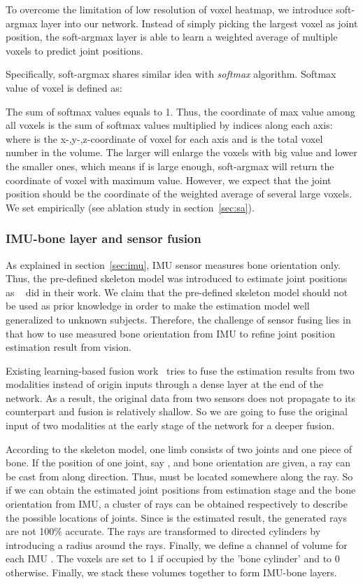 \documentclass[10pt,twocolumn,letterpaper]{article}
\begin{document}
To overcome the limitation of low resolution of voxel heatmap, we introduce soft-argmax layer into our network. Instead of simply picking the largest voxel as joint position, the soft-argmax layer is able to learn a weighted average of multiple voxels to predict joint positions. 

Specifically, soft-argmax shares similar idea with \textit{softmax} algorithm. Softmax value of voxel  is defined as:

The sum of softmax values equals to 1. Thus, the coordinate of max value among all voxels is the sum of softmax values multiplied by indices along each axis: 
where  is the x-,y-,z-coordinate of voxel  for each axis and  is the total voxel number in the volume. The larger  will enlarge the voxels with big value and lower the smaller ones, which means if  is large enough, soft-argmax will return the coordinate of voxel with maximum value. However, we expect that the joint position should be the coordinate of the weighted average of several large voxels. We set  empirically (see ablation study in section~\ref{sec:sa}).



\vspace{-0.4cm}
\subsubsection{IMU-bone layer and sensor fusion}
\label{sec:ib}
As explained in section~\ref{sec:imu}, IMU sensor measures bone orientation only. Thus, the pre-defined skeleton model was introduced to estimate joint positions as ~\cite{von2018recovering,trumble2017total,von2016human} did in their work. We claim that the pre-defined skeleton model should not be used as prior knowledge in order to make the estimation model well generalized to unknown subjects. Therefore, the challenge of sensor fusing lies in that how to use measured bone orientation from IMU to refine joint position estimation result from vision. 

Existing learning-based fusion work~\cite{trumble2017total} tries to fuse the estimation results from two modalities instead of origin inputs through a dense layer at the end of the network. As a result, the original data from two sensors does not propagate to its counterpart and fusion is relatively shallow. So we are going to fuse the original input of two modalities at the early stage of the network for a deeper fusion.

According to the skeleton model, one limb  consists of two joints  and one piece of bone. If the position of one joint, say , and bone orientation  are given, a ray  can be cast from  along  direction. Thus,  must be located somewhere along the ray. So if we can obtain the estimated joint positions  from estimation stage and the bone orientation  from IMU, a cluster of rays can be obtained respectively to describe the possible locations of joints. Since  is the estimated result, the generated rays are not 100\% accurate. The rays are transformed to directed cylinders by introducing a radius  around the rays. Finally, we define a channel of volume  for each IMU . The voxels are set to 1 if occupied by the 'bone cylinder' and to 0 otherwise. Finally, we stack these volumes together to form IMU-bone layers.   
\end{document}
